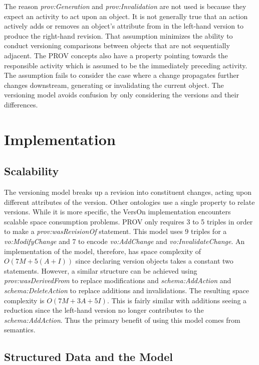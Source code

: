 The reason \textit{prov:Generation} and \textit{prov:Invalidation} are not used is because they expect an activity to act upon an object.
It is not generally true that an action actively adds or removes an object's attribute from in the left-hand version to produce the right-hand revision.
That assumption minimizes the ability to conduct versioning comparisons between objects that are not sequentially adjacent.
The PROV concepts also have a property pointing towards the responsible activity which is assumed to be the immediately preceding activity.
The assumption fails to consider the case where a change propagates further changes downstream, generating or invalidating the current object.
The versioning model avoids confusion by only considering the versions and their differences.

\section{Implementation}

\subsection{Scalability}

The versioning model breaks up a revision into constituent changes, acting upon different attributes of the version.
Other ontologies use a single property to relate versions.
While it is more specific, the VersOn implementation encounters scalable space consumption problems.
PROV only requires 3 to 5 triples in order to make a \textit{prov:wasRevisionOf} statement.
This model uses 9 triples for a \textit{vo:ModifyChange} and 7 to encode \textit{vo:AddChange} and \textit{vo:InvalidateChange}.
An implementation of the model, therefore, has space complexity of \(O(7M+5(A+I))\) since declaring version objects takes a constant two statements.
However, a similar structure can be achieved using \textit{prov:wasDerivedFrom} to replace modifications and \textit{schema:AddAction} and \textit{schema:DeleteAction} to replace additions and invalidations.
The resulting space complexity is \(O(7M+3A+5I)\).
This is fairly similar with additions seeing a reduction since the left-hand version no longer contributes to the \textit{schema:AddAction}.
Thus the primary benefit of using this model comes from semantics.

\subsection{Structured Data and the Model}

